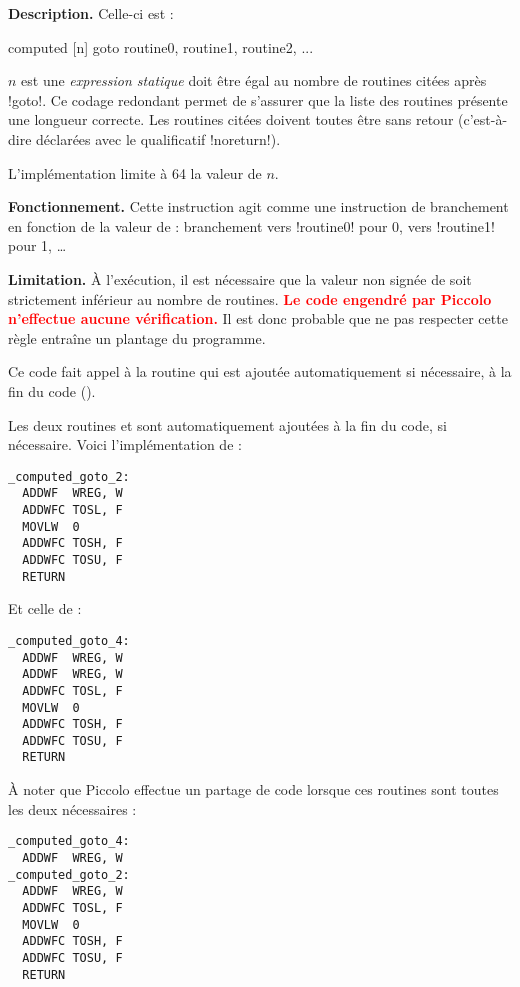 \textbf{Description.} Celle-ci est :
\begin{piccolo}
computed [n] goto routine0, routine1, routine2, ...
\end{piccolo}

$n$ est une \emph{expression statique} doit être égal au nombre de routines citées après \pic!goto!. Ce codage redondant permet de s'assurer que la liste des routines présente une longueur correcte. Les routines citées doivent toutes être sans retour (c'est-à-dire déclarées avec le qualificatif \pic!noreturn!).

L'implémentation limite à 64 la valeur de $n$.

\textbf{Fonctionnement.} Cette instruction agit comme une instruction de branchement en fonction de la valeur de  : branchement vers \pic!routine0! pour 0, vers \pic!routine1! pour 1, \dots 

\textbf{Limitation.} À l'exécution, il est nécessaire que la valeur non signée de  soit strictement inférieur au nombre de routines. \textcolor{red}{\bf Le code engendré par Piccolo n'effectue aucune vérification.} Il est donc probable que ne pas respecter cette règle entraîne un plantage du programme.


Ce code fait appel à la routine  qui est ajoutée automatiquement si nécessaire, à la fin du code (). 





Les deux routines  et  sont automatiquement ajoutées à la fin du code, si nécessaire. Voici l'implémentation de  :
\begin{lstlisting}[language=assembleur]
_computed_goto_2:
  ADDWF  WREG, W
  ADDWFC TOSL, F
  MOVLW  0
  ADDWFC TOSH, F
  ADDWFC TOSU, F
  RETURN
\end{lstlisting}

Et celle de  :
\begin{lstlisting}[language=assembleur]
_computed_goto_4:
  ADDWF  WREG, W
  ADDWF  WREG, W
  ADDWFC TOSL, F
  MOVLW  0
  ADDWFC TOSH, F
  ADDWFC TOSU, F
  RETURN
\end{lstlisting}

À noter que Piccolo effectue un partage de code lorsque ces routines sont toutes les deux nécessaires :
\begin{lstlisting}[language=assembleur]
_computed_goto_4:
  ADDWF  WREG, W
_computed_goto_2:
  ADDWF  WREG, W
  ADDWFC TOSL, F
  MOVLW  0
  ADDWFC TOSH, F
  ADDWFC TOSU, F
  RETURN
\end{lstlisting}












